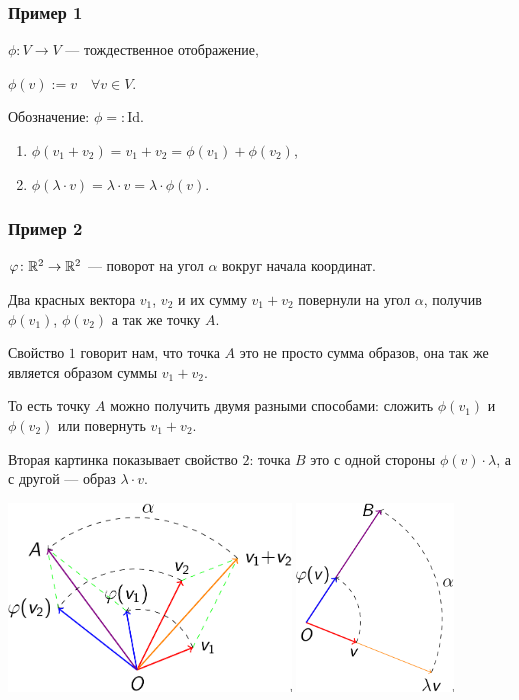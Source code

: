 \subsubsection{Пример 1}

$\phi\colon V \to V$ --- тождественное отображение,

$\phi(v) := v \quad \forall v \in V$.

Обозначение: $\phi =: \text{Id}$.

\bigskip
\begin{enumerate}[label=\arabic*), nosep]
\item $\phi(v_1 + v_2) = v_1 + v_2 = \phi(v_1) + \phi(v_2)$,
\item $\phi(\lambda \cdot v) = \lambda \cdot v = \lambda \cdot \phi(v)$.
\end{enumerate}

\subsubsection{Пример 2}

$\varphi\colon \mathbb{R}^2 \to \mathbb{R}^2$ --- поворот на угол $\alpha$ вокруг начала координат. 

\bigskip
Два красных вектора $v_1$, $v_2$ и их сумму $v_1 + v_2$ повернули на угол $\alpha$, получив $\phi(v_1)$, $\phi(v_2)$ а так же точку $A$.

Свойство $1$ говорит нам, что точка $A$ это не просто сумма образов, она так же является образом суммы $v_1 + v_2$.

То есть точку $A$ можно получить двумя разными способами: сложить $\phi(v_1)$ и $\phi(v_2)$ или повернуть $v_1 + v_2$.

\bigskip
Вторая картинка показывает свойство $2$: точка $B$ это с одной стороны $\phi(v) \cdot \lambda$, а с другой --- образ $\lambda \cdot v$. 

\begin{center}
    \includegraphics[height=5cm]{lecture16_example2_1}
    \hspace{2cm}
    \includegraphics[height=5cm]{lecture16_example2_2}
\end{center}

